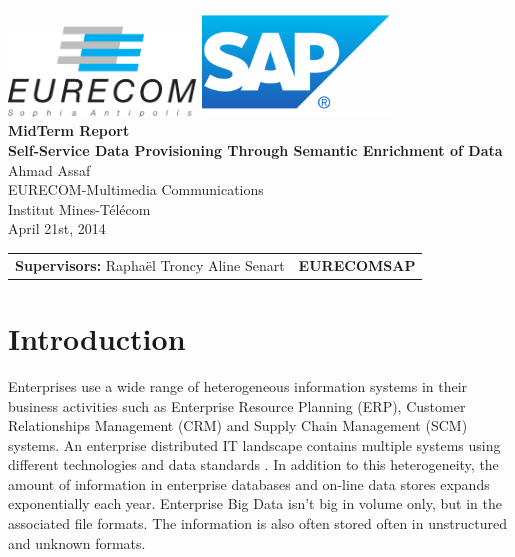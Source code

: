 \documentclass[onecolumn, crcready]{iosart2c}
\begin{document}
\begin{center}
\includegraphics[width=5cm]{EURECOM_logo_quadri}\hspace{5cm}
\includegraphics[width=5cm]{SAP_logo}
\\[3cm]
\textbf{\Huge{MidTerm Report}}
\\[4cm]
\textbf{\LARGE{Self-Service Data Provisioning Through Semantic Enrichment of Data}}
\\[0.5cm]
\LARGE{Ahmad Assaf}
\\[0.5cm]
\small{EURECOM-Multimedia Communications}
\\
\large{Institut Mines-T\'{e}l\'{e}com}
\\
\large{April 21st, 2014}
\\[5cm]
\begin{tabular}{p{8cm} p{8.5cm}}
\small{\textbf{Supervisors:}\newline
Rapha\"el Troncy \newline Aline Senart}
&
\small{\textbf{\newline EURECOM\newline SAP}}
\end{tabular}
\end{center}


\section{Introduction}
Enterprises use a wide range of heterogeneous information systems in their business activities such as Enterprise Resource Planning (ERP), Customer Relationships Management (CRM) and Supply Chain Management (SCM) systems. An enterprise distributed IT landscape contains multiple systems using different technologies and data standards \cite{DBLP:conf/semweb/MihindukulasooriyaGG13}. In addition to this heterogeneity, the amount of information in enterprise databases and on-line data stores expands exponentially each year. Enterprise Big Data isn't big in volume only, but in the associated file formats. The information is also often stored often in unstructured and unknown formats.\\
\end{document}
